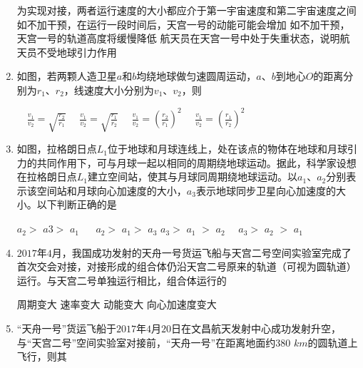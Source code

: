 \begin{enumerate}[leftmargin=0em]
\fourchoices
{为实现对接，两者运行速度的大小都应介于第一宇宙速度和第二宇宙速度之间}
{如不加干预，在运行一段时间后，天宫一号的动能可能会增加}
{如不加干预，天宫一号的轨道高度将缓慢降低}
{航天员在天宫一号中处于失重状态，说明航天员不受地球引力作用}




\item 
{}
如图，若两颗人造卫星$ a $和$ b $均绕地球做匀速圆周运动，$ a $、$ b $到地心$ O $的距离分别为$ r_{1} $、$ r_{2} $，线速度大小分别为$ v_{1} $、$ v_{2} $，则  

\begin{figure}[h!]
\centering

\end{figure}

\fourchoices
{$ \quad \frac { v _ { 1 } } { v _ { 2 } } = \sqrt { \frac { r _ { 2 } } { r _ { 1 } } } $}
{$ \quad \frac { v _ { 1 } } { v _ { 2 } } = \sqrt { \frac { r _ { 1 } } { r _ { 2 } } } $}
{$ \quad \frac { v _ { 1 } } { v _ { 2 } } = \left( \frac { r _ { 2 } } { r _ { 1 } } \right) ^ { 2 } $}
{$ \quad \frac { v _ { 1 } } { v _ { 2 } } = \left( \frac { r _ { 1 } } { r _ { 2 } } \right) ^ { 2 } $}


\item 
{}
如图，拉格朗日点$ L_{1} $位于地球和月球连线上，处在该点的物体在地球和月球引力的共同作用下，可与月球一起以相同的周期绕地球运动。据此，科学家设想在拉格朗日点$ L_{1} $建立空间站，使其与月球同周期绕地球运动。以$ a_{1} $、$ a_{2} $分别表示该空间站和月球向心加速度的大小，$ a_{3} $表示地球同步卫星向心加速度的大小。以下判断正确的是  
\begin{figure}[h!]
\centering

\end{figure}

\fourchoices
{$ a_{2} > $ $ a3> $ $ a_{1} $   }
{$ a_{2} > $ $ a_{1} > $ $ a_{3} $}
{$ a_3> $ $ a_{1} $ $ > $ $ a_{2} $  }
{$ a_3> $ $ a_{2} $ $ > $ $ a_{1} $}

\item 
{}
$ 2017 $年$ 4 $月，我国成功发射的天舟一号货运飞船与天宫二号空间实验室完成了首次交会对接，对接形成的组合体仍沿天宫二号原来的轨道（可视为圆轨道）运行。与天宫二号单独运行相比，组合体运行的  

\fourchoices
{周期变大 }
{速率变大}
{动能变大 }
{向心加速度变大}



\item 
{}
“天舟一号”货运飞船于$ 2017 $年$ 4 $月$ 20 $日在文昌航天发射中心成功发射升空，与“天宫二号”空间实验室对接前，“天舟一号”在距离地面约$ 380 $ $ km $的圆轨道上飞行，则其  



\end{enumerate}
